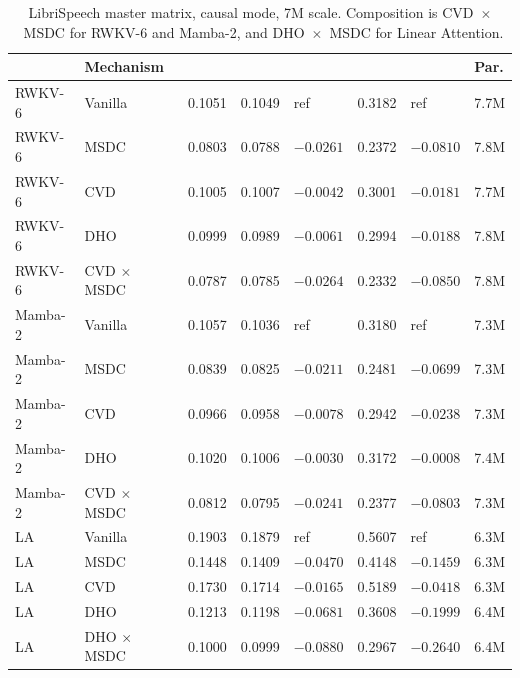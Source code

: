 \begin{table}[p]
\centering
\small
\caption[LibriSpeech master matrix, causal 7M]{LibriSpeech
master matrix, causal mode, 7M scale. Composition is
CVD~$\times$~MSDC for RWKV-6 and Mamba-2, and
DHO~$\times$~MSDC for Linear Attention.}
\label{tab:results:master-matrix-causal-7m}
\setlength{\tabcolsep}{2pt}
\renewcommand{\arraystretch}{1.15}
\begin{tabularx}{\linewidth}{@{}L{1.89cm} L{2.83cm} N{1.43cm} N{1.43cm} N{1.61cm} N{1.49cm} N{1.61cm} N{0.90cm}@{}}
\toprule
\textbf{} & \textbf{Mechanism} &
\textbf{} & \textbf{} & \textbf{\shortstack[r]{$\Delta$\\CER}} &
\textbf{} & \textbf{\shortstack[r]{$\Delta$\\WER}} & \textbf{Par.} \\
\midrule
RWKV-6   & Vanilla         & 0.1051 & 0.1049 & ref       & 0.3182 & ref       & 7.7M \\
RWKV-6   & MSDC            & 0.0803 & 0.0788 & $-0.0261$ & 0.2372 & $-0.0810$ & 7.8M \\
RWKV-6   & CVD             & 0.1005 & 0.1007 & $-0.0042$ & 0.3001 & $-0.0181$ & 7.7M \\
RWKV-6   & DHO             & 0.0999 & 0.0989 & $-0.0061$ & 0.2994 & $-0.0188$ & 7.8M \\
RWKV-6   & CVD $\times$ MSDC & 0.0787 & 0.0785 & $-0.0264$ & 0.2332 & $-0.0850$ & 7.8M \\
\addlinespace
Mamba-2  & Vanilla         & 0.1057 & 0.1036 & ref       & 0.3180 & ref       & 7.3M \\
Mamba-2  & MSDC            & 0.0839 & 0.0825 & $-0.0211$ & 0.2481 & $-0.0699$ & 7.3M \\
Mamba-2  & CVD             & 0.0966 & 0.0958 & $-0.0078$ & 0.2942 & $-0.0238$ & 7.3M \\
Mamba-2  & DHO             & 0.1020 & 0.1006 & $-0.0030$ & 0.3172 & $-0.0008$ & 7.4M \\
Mamba-2  & CVD $\times$ MSDC & 0.0812 & 0.0795 & $-0.0241$ & 0.2377 & $-0.0803$ & 7.3M \\
\addlinespace
LA       & Vanilla         & 0.1903 & 0.1879 & ref       & 0.5607 & ref       & 6.3M \\
LA       & MSDC            & 0.1448 & 0.1409 & $-0.0470$ & 0.4148 & $-0.1459$ & 6.3M \\
LA       & CVD             & 0.1730 & 0.1714 & $-0.0165$ & 0.5189 & $-0.0418$ & 6.3M \\
LA       & DHO             & 0.1213 & 0.1198 & $-0.0681$ & 0.3608 & $-0.1999$ & 6.4M \\
LA       & DHO $\times$ MSDC & 0.1000 & 0.0999 & $-0.0880$ & 0.2967 & $-0.2640$ & 6.4M \\
\bottomrule
\end{tabularx}
\end{table}

